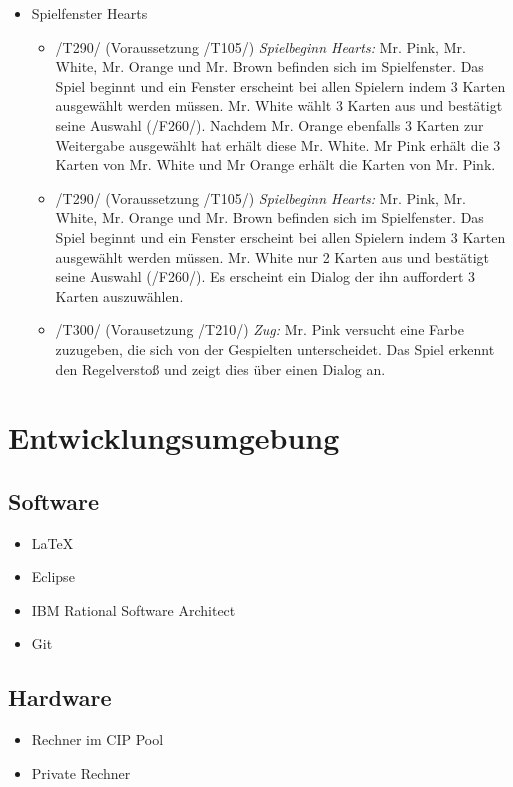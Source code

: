 \documentclass{article}
\begin{document}
\begin{itemize}
\begin{itemize}
	\end{itemize}
	
	\item Spielfenster Hearts
	
	\begin{itemize}
	
		\item /T290/ (Voraussetzung /T105/) \textit{Spielbeginn Hearts:} Mr. Pink, Mr. White, Mr. Orange und Mr. Brown befinden sich im Spielfenster. Das Spiel beginnt und ein Fenster erscheint bei allen Spielern indem 3 Karten ausgewählt werden müssen. Mr. White wählt 3 Karten aus und bestätigt seine Auswahl (/F260/). Nachdem Mr. Orange ebenfalls 3 Karten zur Weitergabe ausgewählt hat erhält diese Mr. White. Mr Pink erhält die 3 Karten von Mr. White und  Mr Orange erhält die Karten von Mr. Pink.

		\item /T290/ (Voraussetzung /T105/) \textit{Spielbeginn Hearts:} Mr. Pink, Mr. White, Mr. Orange und Mr. Brown befinden sich im Spielfenster. Das Spiel beginnt und ein Fenster erscheint bei allen Spielern indem 3 Karten ausgewählt werden müssen. Mr. White nur 2 Karten aus und bestätigt seine Auswahl (/F260/). Es erscheint ein Dialog der ihn auffordert 3 Karten auszuwählen.

		\item /T300/ (Vorausetzung /T210/) \textit{Zug:} Mr. Pink versucht eine Farbe zuzugeben, die sich von der Gespielten unterscheidet. Das Spiel erkennt den Regelverstoß und zeigt dies über einen Dialog an.
	\end{itemize}
\end{itemize}

\section{Entwicklungsumgebung}
\subsection{Software}
\begin{itemize}
	\item LaTeX
	\item Eclipse
	\item IBM Rational Software Architect
	\item Git
\end{itemize}

\subsection{Hardware}
\begin{itemize}
	\item Rechner im CIP Pool	
	\item Private Rechner
\end{itemize}
\end{document}
